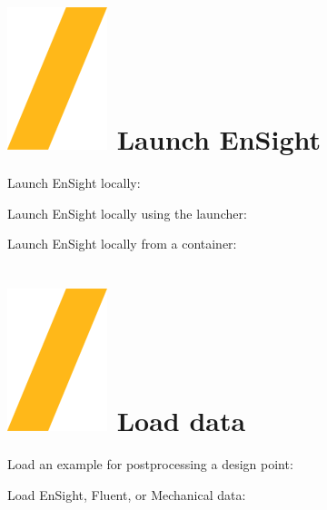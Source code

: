 \documentclass[9pt,landscape]{article}
\begin{document}
\begin{multicols}{3}
\setlength{\premulticols}{0.5pt}
\setlength{\postmulticols}{0.5pt}
\setlength{\multicolsep}{0.5pt}
\setlength{\columnsep}{1pt}


\section{\includegraphics[height=\fontcharht\font`\S]{slash.png} Launch EnSight}


Launch EnSight locally:


Launch EnSight locally using the launcher:

Launch EnSight locally from a container:




\section{\includegraphics[height=\fontcharht\font`\S]{slash.png} Load data}

Load an example for postprocessing a design point:


Load EnSight, Fluent, or Mechanical data:


\end{multicols}
\end{document}

